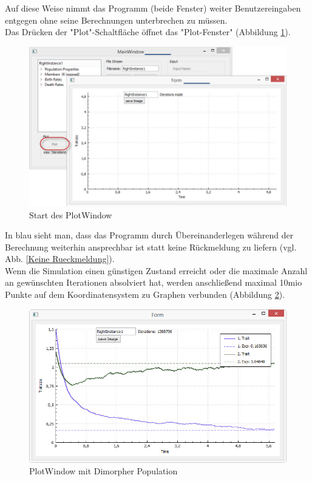 \documentclass[11pt, a4paper, german]{article}
\theoremstyle{plain}
\begin{document}
	Auf diese Weise nimmt das Programm (beide Fenster) weiter Benutzereingaben entgegen ohne seine Berechnungen unterbrechen zu müssen.\\
	Das Drücken der "{}Plot"{}-Schaltfläche öffnet das "{}Plot-Fenster"{} (Abbildung \ref{PlotWindow_start}).
	\begin{figure}[H]
		\centering
		\includegraphics[width=1\linewidth]{./Pictures/PlotWindow_start}
		\caption[PlotWindow_start]{Start des PlotWindow}
		\label{PlotWindow_start}
	\end{figure}
	In blau sieht man, dass das Programm durch Übereinanderlegen während der Berechnung weiterhin ansprechbar ist statt keine Rückmeldung zu liefern (vgl. Abb. \ref{Keine Rueckmeldung}).\\
	Wenn die Simulation  einen günstigen Zustand erreicht oder die maximale Anzahl an gewünschten Iterationen absolviert hat, werden anschließend maximal 10mio Punkte auf dem Koordinatensystem zu Graphen verbunden (Abbildung \ref{PlotWindow_smallBPDL}). 
	\begin{figure}[H]
		\centering
		\includegraphics[width=0.9\linewidth]{./Pictures/PlotWindow_smallBPDL}
		\caption[PlotWindow]{PlotWindow mit Dimorpher Population}
		\label{PlotWindow_smallBPDL}
	\end{figure}
	
\end{document}
